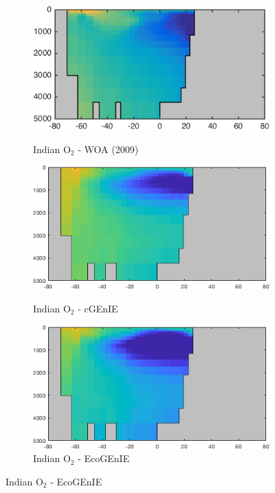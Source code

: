 \documentclass{article}
\begin{document}
\begin{figure}[htp]
\begin{subfigure}{.33\textwidth}
 \label{fig:nutrients2}
\end{subfigure}
\begin{subfigure}{.33\textwidth}
 \caption{Indian O$_2$ - WOA (2009)}
 \includegraphics[width=0.95\linewidth]{../Separate_figures/OBSERVATIONS/Indian_o_an_profile.png}
 \label{fig:nutrients1}
\end{subfigure}%
\begin{subfigure}{.33\textwidth}
 \caption{Indian O$_2$ - cGEnIE}
 \includegraphics[width=0.95\linewidth]{../Separate_figures/BIOGEM/Indian_ocn_O2_profile.png}
 \label{fig:nutrients1}
\end{subfigure}%
\begin{subfigure}{.33\textwidth}
 \caption{Indian O$_2$ - EcoGEnIE}
 \includegraphics[width=0.95\linewidth]{../Separate_figures/ECOGEM/Indian_ocn_O2_profile.png}

\end{subfigure}
\end{figure}
\end{document}
